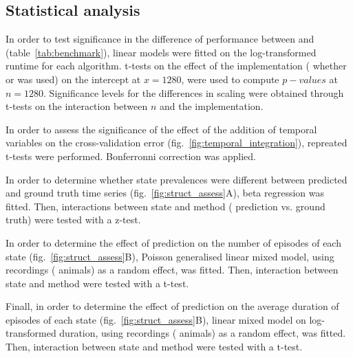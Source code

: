 \subsection{Statistical analysis}
In order to test significance in the difference of performance between \pr{} and \pyeeg{} (table~\ref{tab:benchmark}),
linear models were fitted on the log-transformed runtime for each algorithm. 
t-tests on the effect of the implementation (\ie{} whether \pr{} or \pyeeg{} was used) on the intercept at $x=1280$, were used to compute $p-values$ at $n=1280$.
Significance levels for the differences in scaling were obtained through t-tests on the interaction between $n$ and the implementation.


In order to assess the significance of the effect of the addition of temporal variables on the cross-validation
error (fig.~\ref{fig:temporal_integration}), repreated t-tests were performed.
Bonferronni correction was applied.

In order to determine whether state prevalences were different between predicted and ground truth time series (fig.~\ref{fig:struct_assess}A),
beta regression \citationneeded{} was fitted. 
Then, interactions between state and method (\ie{} prediction vs. ground truth) were tested with a z-test.

In order to determine the effect of prediction on the number of episodes of each state (fig.~\ref{fig:struct_assess}B),
Poisson generalised linear mixed model\citationneeded{}, using recordings (\ie{} animals) as a random effect, was fitted. 
Then, interaction between state and method were tested with a t-test.

Finall, in order to determine the effect of prediction on the average duration of episodes of each state (fig.~\ref{fig:struct_assess}B),
linear mixed model\citationneeded{} on log-transformed duration, using recordings (\ie{} animals) as a random effect, was fitted. 
Then, interaction between state and method were tested with a t-test.



